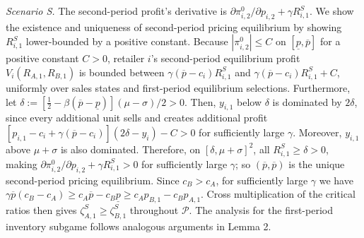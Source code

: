 \documentclass[nonblindrev,copyedit]{informs1}
\begin{document}
\begin{APPENDICES}
\textit{Scenario S. }
The second-period profit's derivative is $\partial \pi^0_{i,2}/\partial p_{i,2} + \gamma R^S_{i,1}$. We show the existence and uniqueness of second-period pricing equilibrium by showing $R^S_{i,1}$ lower-bounded by a positive constant. Because $|\pi^0_{i,2}| \leq C$ on $[\underline{p},\overline{p}]$ for a positive constant $C > 0$, retailer $i$'s second-period equilibrium profit $V_i(R_{A,1},R_{B,1})$ is bounded between $\gamma(\overline{p}-c_i)R^S_{i,1}$ and $\gamma(\overline{p}-c_i)R^S_{i,1}+C$, uniformly over sales states and first-period equilibrium selections. Furthermore, let $\delta :=[\tfrac12-\beta(\overline{p}-\underline{p})](\mu-\sigma)/2>0$. Then, $y_{i,1}$ below $\delta$ is dominated by $2\delta$, since every additional unit sells and creates additional profit $[p_{i,1}-c_i+\gamma (\overline{p} - c_i)](2 \delta - y_i) - C> 0$ for sufficiently large $\gamma$. Moreover, $y_{i,1}$ above $\mu+\sigma$ is also dominated. Therefore, on $[\delta,\mu+\sigma]^2$, all $R^S_{i,1}\geq\delta>0$, making $\partial \pi^0_{i,2}/\partial p_{i,2} + \gamma R^S_{i,1} > 0$ for sufficiently large $\gamma$; so $(\overline{p},\overline{p})$ is the unique second-period pricing equilibrium. Since $c_B>c_A$, for sufficiently large $\gamma$ we have $\gamma\overline p(c_B-c_A)\ge c_A\overline p-c_B\underline p\ge c_Ap_{B,1}-c_Bp_{A,1}$. Cross multiplication of the critical ratios then gives $\zeta_{A,1}^S\ge\zeta_{B,1}^S$ throughout $\mathcal P$. The analysis for the first-period inventory subgame follows analogous arguments in Lemma 2.


\end{APPENDICES}
\end{document}
